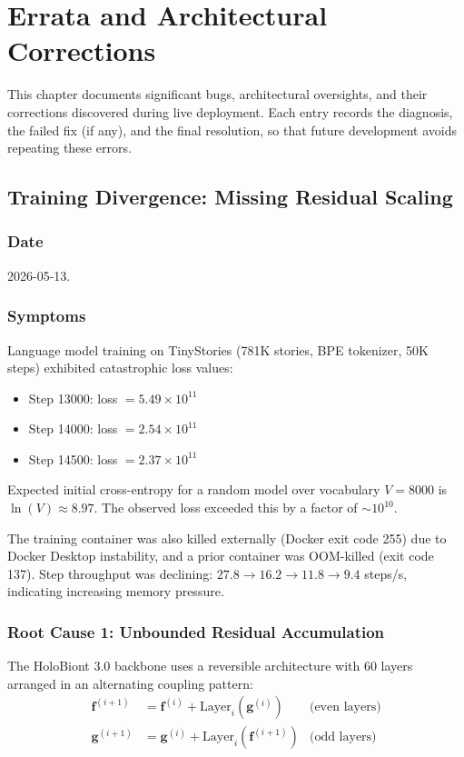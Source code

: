 \chapter{Errata and Architectural Corrections}
\label{ch:corrections}

This chapter documents significant bugs, architectural oversights, and their corrections discovered during live deployment. Each entry records the diagnosis, the failed fix (if any), and the final resolution, so that future development avoids repeating these errors.

\section{Training Divergence: Missing Residual Scaling}
\label{sec:residual-scaling-fix}

\subsection{Date}
2026-05-13.

\subsection{Symptoms}
Language model training on TinyStories (781K stories, BPE tokenizer, 50K steps) exhibited catastrophic loss values:
\begin{itemize}
    \item Step 13000: loss $= 5.49 \times 10^{11}$
    \item Step 14000: loss $= 2.54 \times 10^{11}$
    \item Step 14500: loss $= 2.37 \times 10^{11}$
\end{itemize}
Expected initial cross-entropy for a random model over vocabulary $V = 8000$ is $\ln(V) \approx 8.97$. The observed loss exceeded this by a factor of $\sim 10^{10}$.

The training container was also killed externally (Docker exit code 255) due to Docker Desktop instability, and a prior container was OOM-killed (exit code 137). Step throughput was declining: $27.8 \to 16.2 \to 11.8 \to 9.4$ steps/s, indicating increasing memory pressure.

\subsection{Root Cause 1: Unbounded Residual Accumulation}

The HoloBiont 3.0 backbone uses a reversible architecture with 60 layers arranged in an alternating coupling pattern:
\begin{align}
    \mathbf{f}^{(i+1)} &= \mathbf{f}^{(i)} + \text{Layer}_i(\mathbf{g}^{(i)}) & \text{(even layers)} \\
    \mathbf{g}^{(i+1)} &= \mathbf{g}^{(i)} + \text{Layer}_i(\mathbf{f}^{(i+1)}) & \text{(odd layers)}
\end{align}

